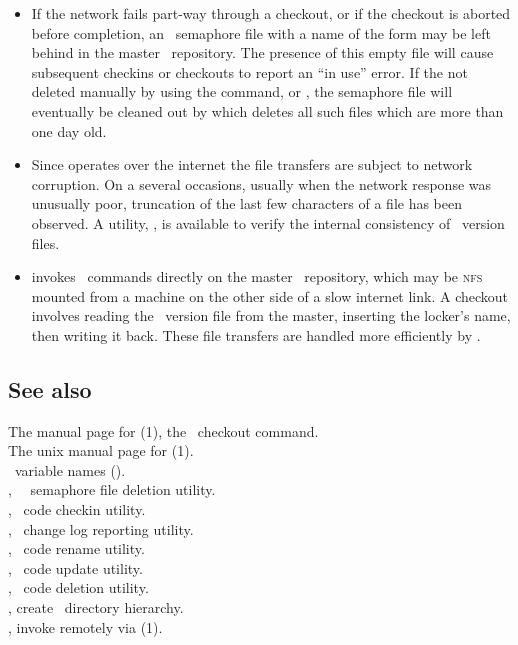 \begin{itemize}
\item
   If the network fails part-way through a checkout, or if the checkout is
   aborted before completion, an \rcs\ semaphore file with a name of the
   form \file{,*,} may be left behind in the master \rcs\ repository.  The
   presence of this empty file will cause subsequent checkins or checkouts to
   report an ``in use'' error.  If the not deleted manually by using the
    command, or , the semaphore file will
   eventually be cleaned out by  which deletes all such files
   which are more than one day old.

\item
   Since  operates over the internet the file transfers are
   subject to network corruption.  On a several occasions, usually when the
   network response was unusually poor, truncation of the last few characters
   of a file has been observed.  A utility, , is available to
   verify the internal consistency of \rcs\ version files.

\item
    invokes \rcs\ commands directly on the master \rcs\ repository,
   which may be \textsc{nfs} mounted from a machine on the other side of a
   slow internet link.  A checkout involves reading the \rcs\ version file from
   the master, inserting the locker's name, then writing it back.  These file
   transfers are handled more efficiently by .
\end{itemize}

\subsection*{See also}

The manual page for (1), the \rcs\ checkout command.\\
The unix manual page for (1).\\
\aipspp\ variable names ().\\
, \aipspp\ \rcs\ semaphore file deletion utility.\\
, \aipspp\ code checkin utility.\\
, \aipspp\ change log reporting utility.\\
, \aipspp\ code rename utility.\\
, \aipspp\ code update utility.\\
, \aipspp\ code deletion utility.\\
, create \aipspp\ directory hierarchy.\\
, invoke  remotely via (1).

